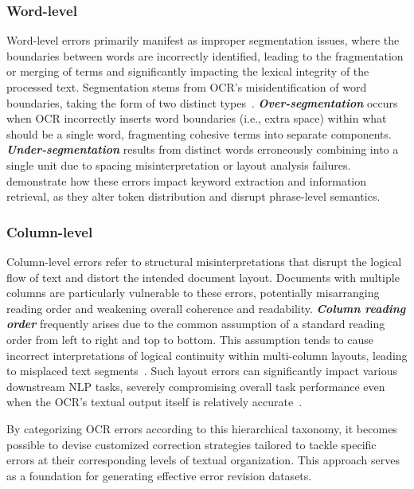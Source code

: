 \subsubsection*{Word-level} 
Word-level errors primarily manifest as improper segmentation issues, where the boundaries between words are incorrectly identified, leading to the fragmentation or merging of terms and significantly impacting the lexical integrity of the processed text. Segmentation stems from OCR's misidentification of word boundaries, taking the form of two distinct types~\cite{suissa2023optimizingneuralnetworktraining, afli-etal-2016-using}. \textbf{\textit{Over-segmentation}} occurs when OCR incorrectly inserts word boundaries (i.e., extra space) within what should be a single word, fragmenting cohesive terms into separate components. \textbf{\textit{Under-segmentation}} results from distinct words erroneously combining into a single unit due to spacing misinterpretation or layout analysis failures. \citet{nastase-hitschler-2018-correction} demonstrate how these errors impact keyword extraction and information retrieval, as they alter token distribution and disrupt phrase-level semantics.





\subsubsection*{Column-level}
Column-level errors refer to structural misinterpretations that disrupt the logical flow of text and distort the intended document layout. Documents with multiple columns are particularly vulnerable to these errors, potentially misarranging reading order and weakening overall coherence and readability. \textbf{\textit{Column reading order}} frequently arises due to the common assumption of a standard reading order from left to right and top to bottom. This assumption tends to cause incorrect interpretations of logical continuity within multi-column layouts, leading to misplaced text segments~\cite{wang2023textreadingorderuncontrolled, wang2021layoutreaderpretrainingtextlayout}. Such layout errors can significantly impact various downstream NLP tasks, severely compromising overall task performance even when the OCR's textual output itself is relatively accurate~\cite{artidigh20}.

By categorizing OCR errors according to this hierarchical taxonomy, it becomes possible to devise customized correction strategies tailored to tackle specific errors at their corresponding levels of textual organization. This approach serves as a foundation for generating effective error revision datasets.












